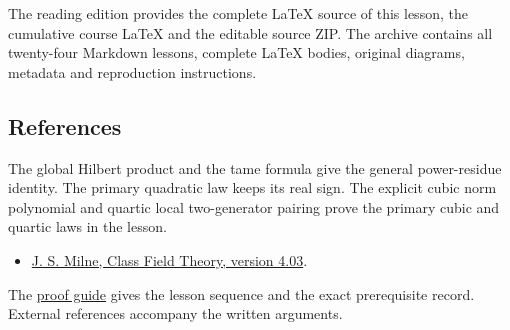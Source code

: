 \documentclass[11pt,a4paper]{article}
\newcommand{\tightlist}{\setlength{\itemsep}{0pt}\setlength{\parskip}{0pt}}
\begin{document}
The reading edition provides the complete LaTeX source of this lesson,
the cumulative course LaTeX and the editable source ZIP. The archive
contains all twenty-four Markdown lessons, complete LaTeX bodies,
original diagrams, metadata and reproduction instructions.

\subsection{References}\label{references}

The global Hilbert product and the tame formula give the general
power-residue identity. The primary quadratic law keeps its real sign.
The explicit cubic norm polynomial and quartic local two-generator
pairing prove the primary cubic and quartic laws in the lesson.

\begin{itemize}
\tightlist
\item
  \href{https://www.jmilne.org/math/CourseNotes/CFT.pdf}{J. S. Milne,
  Class Field Theory, version 4.03}.
\end{itemize}

The \href{../free-proofs.html}{proof guide} gives the lesson sequence
and the exact prerequisite record. External references accompany the
written arguments.
\end{document}
